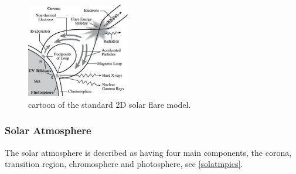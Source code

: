 \begin{figure}[H]
  \begin{center}
  \includegraphics[width=0.40\textwidth]{flare}
  \caption{cartoon of the standard 2D solar flare model.}\label{flare-cartoon}
\end{center}
\end{figure}




\subsubsection{Solar Atmosphere}
The solar atmosphere \citep{2003dysu.book.....D, 2004soas.book.....F} is described as having four main components, the corona, transition region, chromosphere and photosphere, see \ref{solatmpics}. 

